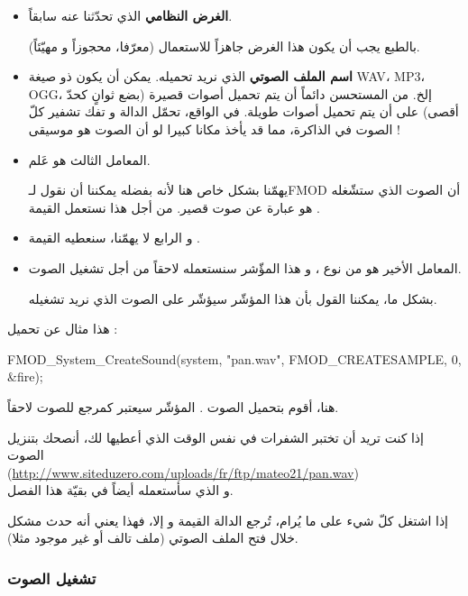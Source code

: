 \begin{itemize}
	\item \textbf{الغرض النظامي}
	 الذي تحدّثنا عنه سابقاً.
	
	بالطبع يجب أن يكون هذا الغرض جاهزاً للاستعمال (معرّفا، محجوزاً و مهيّئاً).
	\item \textbf{اسم الملف الصوتي}
	الذي نريد تحميله. يمكن أن يكون ذو صيغة
	\textenglish{WAV}، \textenglish{MP3}، \textenglish{OGG}،
	إلخ. من المستحسن دائماً أن يتم تحميل أصوات قصيرة (بضع ثوانٍ كحدّ أقصى) على أن يتم تحميل أصوات طويلة. في الواقع، تحمّل الدالة و تفك تشفير كلّ الصوت في الذاكرة، مما قد يأخذ مكانا كبيرا لو أن الصوت هو موسيقى !
	\item المعامل الثالث هو عَلم. 
	
	يهمّنا بشكل خاص هنا لأنه بفضله يمكننا أن نقول لـ\textenglish{FMOD}
	أن الصوت الذي ستشّغله هو عبارة عن صوت قصير. من أجل هذا نستعمل القيمة
	.
	\item و الرابع لا يهمّنا، سنعطيه القيمة 
	.
	\item المعامل الأخير هو من نوع
	،
	و هذا المؤّشر سنستعمله لاحقاً من أجل تشغيل الصوت.
	
	بشكل ما، يمكننا القول بأن هذا المؤشّر سيؤشّر على الصوت الذي نريد تشغيله.
\end{itemize}

 هذا مثال عن تحميل :

\begin{Csource}
FMOD_System_CreateSound(system, "pan.wav", FMOD_CREATESAMPLE, 0, &fire);
\end{Csource}

هنا، أقوم بتحميل الصوت
.
المؤشّر
سيعتبر كمرجع للصوت لاحقاً.

\begin{information}
 إذا كنت تريد أن تختبر الشفرات في نفس الوقت الذي أعطيها لك، أنصحك بتنزيل الصوت
\\
 (\url{http://www.siteduzero.com/uploads/fr/ftp/mateo21/pan.wav})\\
 و الذي سأستعمله أيضاً في بقيّة هذا الفصل.
\end{information}

إذا اشتغل كلّ شيء على ما يُرام، تُرجع الدالة القيمة
و إلا، فهذا يعني أنه حدث مشكل خلال فتح الملف الصوتي (ملف تالف أو غير موجود مثلا).

\subsubsection{تشغيل الصوت}

